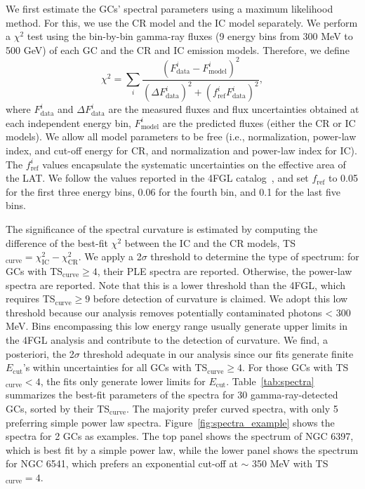 \documentclass[doublespace,nopageskip]{VTthesis} %
\begin{document}
We first estimate the GCs' spectral parameters using a maximum likelihood method. For this, we use the CR model and the IC model separately. We perform a $\chi^2$ test using the bin-by-bin gamma-ray fluxes (9 energy bins from 300 MeV to 500 GeV) of each GC and the CR and IC emission models. Therefore, we define 
\begin{equation}
    \chi^2=\sum_i\frac{(F_\text{data}^i-F_\text{model}^i)^2}{(\Delta F_\text{data}^i)^2+(f_\text{ref}^i F_\text{data}^i)^2},
\end{equation}
where $F_\mathrm{data}^i$ and $\Delta F_\mathrm{data}^i$ are the measured fluxes and flux uncertainties obtained at each independent energy bin,  $F_\mathrm{model}^i$ are the predicted fluxes (either the CR or IC models). We allow all model parameters to be free (i.e., normalization, power-law index, and cut-off energy for CR, and normalization and power-law index for IC). The $f_\text{ref}^i$ values encapsulate the systematic uncertainties on the effective area of the LAT. We follow the values reported in the 4FGL catalog~\citep{2020ApJS..247...33A}, and set $f_\text{ref}$ to 0.05 for the first three energy bins, 0.06 for the fourth bin, and 0.1 for the last five bins.

The significance of the spectral curvature is estimated by computing the difference of the best-fit $\chi^2$ between the IC and the CR models, TS$_\mathrm{curve} = \chi^2_\text{IC} - \chi^2_\text{CR}.$ We apply a 2$\sigma$ threshold to determine the type of spectrum: for GCs with TS$_\mathrm{curve} \ge 4$, their PLE spectra are reported. Otherwise, the power-law spectra are reported. Note that this is a lower threshold than the 4FGL, which requires TS$_\mathrm{curve} \ge 9$ before detection of curvature is claimed. We adopt this low threshold because our analysis removes potentially contaminated photons < 300 MeV. Bins encompassing this low energy range usually generate upper limits in the 4FGL analysis and contribute to the detection of curvature. We find, a posteriori, the 2$\sigma$ threshold adequate in our analysis since our fits generate finite $E_\mathrm{cut}$'s within uncertainties for all GCs with TS$_\mathrm{curve} \ge 4$. For those GCs with TS$_\mathrm{curve} < 4$, the fits only generate lower limits for $E_\mathrm{cut}$. Table~\ref{tab:spectra} summarizes the best-fit parameters of the spectra for 30 gamma-ray-detected GCs, sorted by their TS$_\mathrm{curve}$. The majority prefer curved spectra, with only 5 preferring simple power law spectra. Figure~\ref{fig:spectra_example} shows the spectra for 2 GCs as examples. The top panel shows the spectrum of NGC 6397, which is best fit by a simple power law, while the lower panel shows the spectrum for NGC 6541, which prefers an exponential cut-off at $\sim$ 350 MeV with TS$_\mathrm{curve}=4$. 
\end{document}
